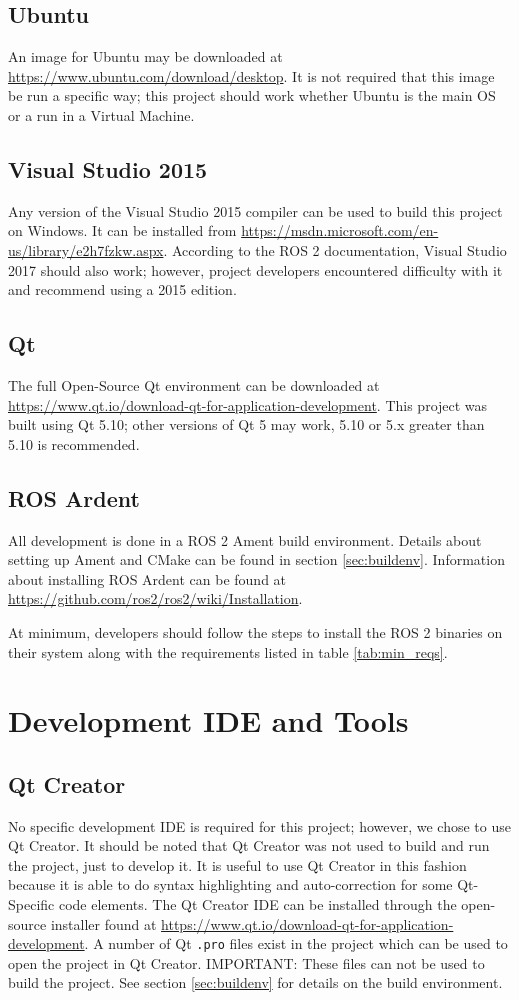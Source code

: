 \subsection{Ubuntu}
An image for Ubuntu may be downloaded at \url{https://www.ubuntu.com/download/desktop}. It is not required that this image be run a specific way; this project should work whether Ubuntu is the main OS or a run in a Virtual Machine.

\subsection{Visual Studio 2015}
Any version of the Visual Studio 2015 compiler can be used to build this project on Windows. It can be installed from \url{https://msdn.microsoft.com/en-us/library/e2h7fzkw.aspx}. According to the ROS 2 documentation, Visual Studio 2017 should also work; however, project developers encountered difficulty with it and recommend using a 2015 edition.

\subsection{Qt}
The full Open-Source Qt environment can be downloaded at \\ \url{https://www.qt.io/download-qt-for-application-development}. This project was built using Qt 5.10; other versions of Qt 5 may work, 5.10 or 5.x greater than 5.10 is recommended.

\subsection{ROS Ardent}
All development is done in a ROS 2 Ament build environment. Details about setting up Ament and CMake can be found in section \ref{sec:buildenv}. Information about installing ROS Ardent can be found at \url{https://github.com/ros2/ros2/wiki/Installation}.

At minimum, developers should follow the steps to install the ROS 2 binaries on their system along with the requirements listed in table \ref{tab:min_reqs}.

\section{Development IDE and Tools}
\subsection{Qt Creator}
No specific development IDE is required for this project; however, we chose to use Qt Creator. It should be noted that Qt Creator was not used to build and run the project, just to develop it. It is useful to use Qt Creator in this fashion because it is able to do syntax highlighting and auto-correction for some Qt-Specific code elements. The Qt Creator IDE can be installed through the open-source installer found at \url{https://www.qt.io/download-qt-for-application-development}. A number of Qt \lstinline|.pro| files exist in the project which can be used to open the project in Qt Creator. IMPORTANT: These files can not be used to build the project. See section \ref{sec:buildenv} for details on the build environment.

